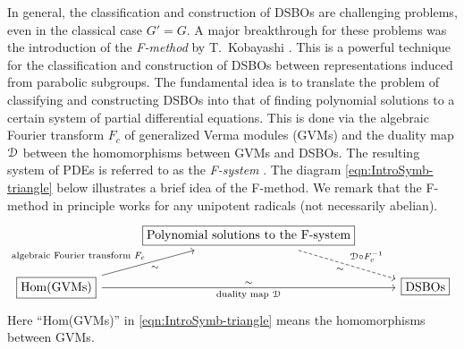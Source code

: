 \documentclass[a4paper,11pt,reqno]{amsart}
\newcommand{\0}{{\bf 0}}
\newcommand{\1}{{\bf 1}}
\theoremstyle{plain}
\theoremstyle{definition}
\numberwithin{equation}{section}
\theoremstyle{definition}
\begin{document}
In general, the classification and construction of DSBOs are challenging problems, even in the classical case $G'=G$. A major breakthrough for these problems was the introduction of the \emph{F-method} by T.~Kobayashi \cite{Kobayashi13}.
This is a powerful technique for the classification and construction of DSBOs between representations induced from parabolic subgroups. The fundamental idea is to translate 
the problem of classifying and constructing DSBOs into that of finding polynomial solutions to a certain system of partial differential equations. This is done via the algebraic Fourier transform $F_c$ of 
generalized Verma modules (GVMs)
and the duality map $\EuScript{D}$ between
the homomorphisms between GVMs and DSBOs. 
The resulting system of PDEs is referred to as 
the \emph{F-system} \cite[Fact 3.3]{KoKuPe16}.
The diagram \eqref{eqn:IntroSymb-triangle} below illustrates a brief idea of the F-method.
We remark that the F-method in principle works for any unipotent radicals
(not necessarily abelian).
\begin{equation}
\label{eqn:IntroSymb-triangle}
\begin{tikzcd}[column sep=1cm]
	& {\text{\fbox{Polynomial solutions to the F-system}}} &\\
	{\text{\fbox{Hom(GVMs)}}}&& {\text{\fbox{DSBOs}}}
	\arrow["{\text{algebraic Fourier transform $F_c$}}","{\sim}"', from=2-1, to=1-2]
	\arrow["{\text{duality map $\EuScript{D}$}}"',"{\sim}", from=2-1, to=2-3]
	\arrow["{\EuScript{D} \circ F_c^{-1}}","{\sim}"', dashed,from=1-2, to=2-3]
\end{tikzcd}
\end{equation}
Here ``Hom(GVMs)'' in \eqref{eqn:IntroSymb-triangle} 
means the homomorphisms between GVMs.
\end{document}
